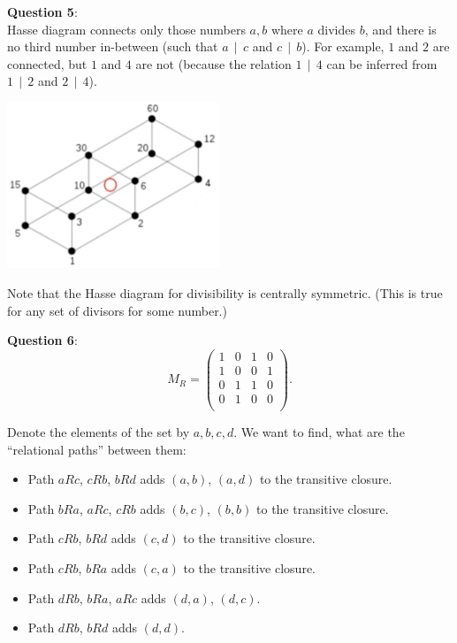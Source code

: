 \documentclass[jou]{apa6}
\begin{document}
\vspace{6pt}
{\bf Question 5}:\\
Hasse diagram connects only those numbers $a,b$ where $a$ divides $b$, and
there is no third  number in-between (such that $a\,\mid\,c$ and $c\,\mid\,b$). 
For example, $1$ and $2$ are connected, but $1$ and $4$ are not 
(because the relation $1\,\mid\,4$ can be inferred from 
$1\,\mid\,2$ and $2\,\mid\,4$).
\begin{center}
\includegraphics[width=2.5in]{hasse-diagram-60.png}
\end{center}
Note that the Hasse diagram for divisibility is centrally symmetric. 
(This is true for any set of divisors for some number.)


\vspace{6pt}
{\bf Question 6}:\\
$$M_R  = \left( \begin{array}{cccc}
1 & 0 & 1 & 0 \\
1 & 0 & 0 & 1 \\
0 & 1 & 1 & 0 \\
0 & 1 & 0 & 0 \\
\end{array} \right).$$

Denote the elements of the set by $a,b,c,d$. We want to find, 
what are the ``relational paths'' between them:
\begin{itemize}
\item Path $aRc$, $cRb$, $bRd$ adds $(a,b)$, $(a,d)$ to the transitive closure.
\item Path $bRa$, $aRc$, $cRb$ adds $(b,c)$, $(b,b)$ to the transitive closure.
\item Path $cRb$, $bRd$ adds $(c,d)$ to the transitive closure.
\item Path $cRb$, $bRa$ adds $(c,a)$ to the transitive closure.
\item Path $dRb$, $bRa$, $aRc$ adds $(d,a)$, $(d,c)$.
\item Path $dRb$, $bRd$ adds $(d,d)$.
\end{itemize}
\end{document}
